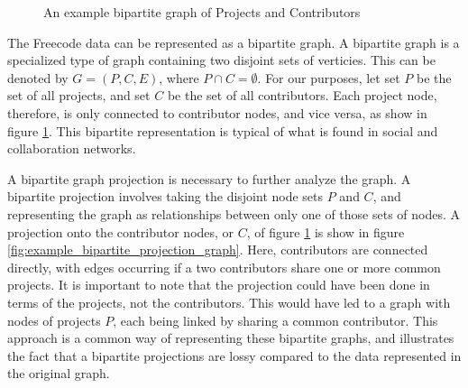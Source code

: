 \documentclass{proc}
\begin{document}
\begin{figure}
\centering
{}
\caption{An example bipartite graph of Projects and Contributors}
\label{fig:example_bipartite_graph}
\end{figure}

The Freecode data can be represented as a bipartite graph. A bipartite graph is a specialized type of graph containing two disjoint sets of verticies. This can be denoted by ${G=(P,C,E)}$, where ${P \cap C = \emptyset}$. For our purposes, let set $P$ be the set of all projects, and set $C$ be the set of all contributors. Each project node, therefore, is only connected to contributor nodes, and vice versa, as show in figure \ref{fig:example_bipartite_graph}. This bipartite representation is typical of what is found in social and collaboration networks\cite{ramasco2004self}.  

A bipartite graph projection is necessary to further analyze the graph. A bipartite projection involves taking the disjoint node sets $P$ and $C$, and representing the graph as relationships between only one of those sets of nodes. A projection onto the contributor nodes, or $C$, of figure \ref{fig:example_bipartite_graph} is show in figure \ref{fig:example_bipartite_projection_graph}. Here, contributors are connected directly, with edges occurring if a two contributors share one or more common projects. It is important to note that the projection could have been done in terms of the projects, not the contributors. This would have led to a graph with nodes of projects $P$, each being linked by sharing a common contributor. This approach is a common way of representing these bipartite graphs\cite{newman2001scientific}, and illustrates the fact that a bipartite projections are lossy compared to the data represented in the original graph\cite{zhou2007bipartite}.\\
\end{document}
